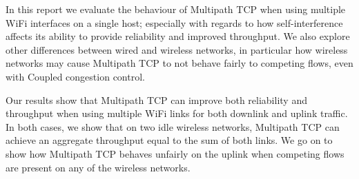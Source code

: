 In this report we evaluate the behaviour of Multipath TCP when using multiple
WiFi interfaces on a single host; especially with regards to how
self-interference affects its ability to provide reliability and improved
throughput. We also explore other differences between wired and wireless
networks, in particular how wireless networks may cause Multipath TCP to not
behave fairly to competing flows, even with Coupled congestion control.

Our results show that Multipath TCP can improve both reliability and throughput
when using multiple WiFi links for both downlink and uplink traffic. In both
cases, we show that on two idle wireless networks, Multipath TCP can achieve an
aggregate throughput equal to the sum of both links. We go on to show how
Multipath TCP behaves unfairly on the uplink when competing flows are present on
any of the wireless networks.
